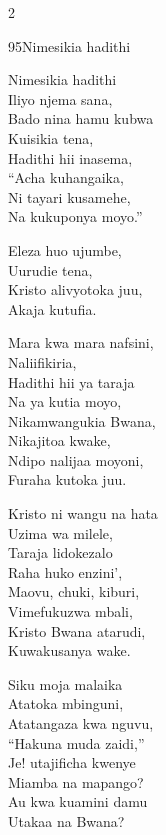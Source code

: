 \begin{multicols}{2}
\begin{hymn}{95}{Nimesikia hadithi}{}
\begin{stanza}
Nimesikia hadithi\\
Iliyo njema sana,\\
Bado nina hamu kubwa\\
Kuisikia tena,\\
Hadithi hii inasema,\\
``Acha kuhangaika,\\
Ni tayari kusamehe,\\
Na kukuponya moyo.''
\end{stanza}
\begin{chorus}
Eleza huo ujumbe,\\
Uurudie tena,\\
Kristo alivyotoka juu,\\
Akaja kutufia.
\end{chorus}
\begin{stanza}
Mara kwa mara nafsini,\\
Naliifikiria,\\
Hadithi hii ya taraja\\
Na ya kutia moyo,\\
Nikamwangukia Bwana,\\
Nikajitoa kwake,\\
Ndipo nalijaa moyoni,\\
Furaha kutoka juu.
\end{stanza}
\begin{stanza}
Kristo ni wangu na hata\\
Uzima wa milele,\\
Taraja lidokezalo\\
Raha huko enzini',\\
Maovu, chuki, kiburi,\\
Vimefukuzwa mbali,\\
Kristo Bwana atarudi,\\
Kuwakusanya wake.
\end{stanza}
\begin{stanza}
Siku moja malaika\\
Atatoka mbinguni,\\
Atatangaza kwa nguvu,\\
``Hakuna muda zaidi,''\\
Je! utajificha kwenye\\
Miamba na mapango?\\
Au kwa kuamini damu\\
Utakaa na Bwana?
\end{stanza}
\end{hymn}


\end{multicols}
